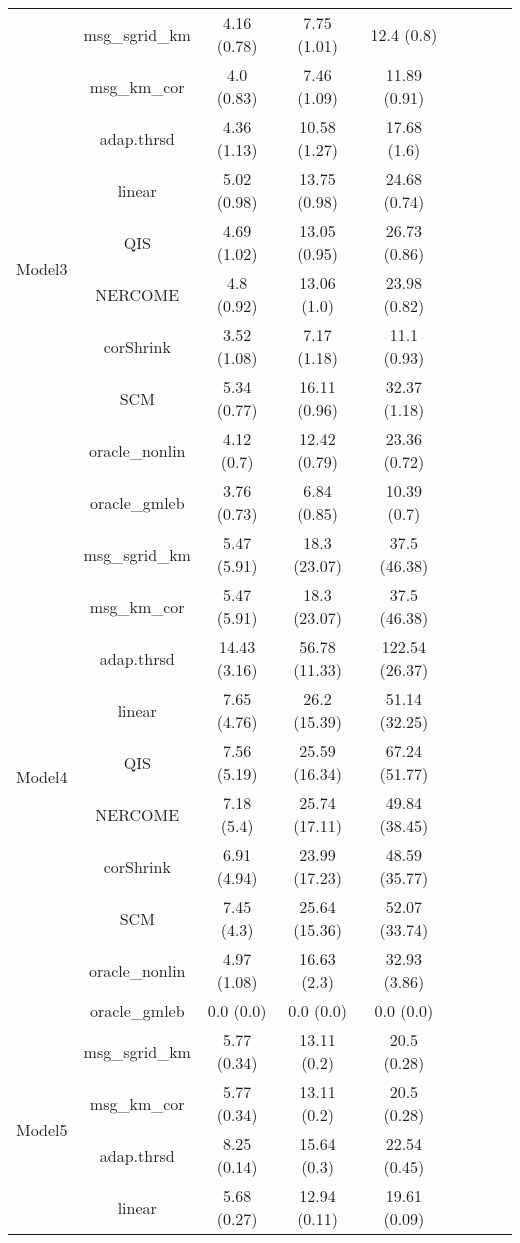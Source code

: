 \documentclass[useAMS,referee,usenatbib]{biom}
\begin{document}
\begin{table}[H]
{\begin{tabular}{ccccccccc}
\multirow{10}{*}{Model3}    
 & msg\_sgrid\_km & 4.16 (0.78) & 7.75 (1.01)  & 12.4 (0.8)   \\
 & msg\_km\_cor   & 4.0 (0.83)  & 7.46 (1.09)  & 11.89 (0.91) \\
 & adap.thrsd     & 4.36 (1.13) & 10.58 (1.27) & 17.68 (1.6)  \\
 & linear         & 5.02 (0.98) & 13.75 (0.98) & 24.68 (0.74) \\
 & QIS            & 4.69 (1.02) & 13.05 (0.95) & 26.73 (0.86) \\
 & NERCOME        & 4.8 (0.92)  & 13.06 (1.0)  & 23.98 (0.82) \\
 & corShrink      & 3.52 (1.08) & 7.17 (1.18)  & 11.1 (0.93)  \\
 & SCM            & 5.34 (0.77) & 16.11 (0.96) & 32.37 (1.18) \\
 & oracle\_nonlin & 4.12 (0.7)  & 12.42 (0.79) & 23.36 (0.72) \\
 & oracle\_gmleb  & 3.76 (0.73) & 6.84 (0.85)  & 10.39 (0.7)  \\  \midrule
\multirow{10}{*}{Model4}    
 & msg\_sgrid\_km & 5.47 (5.91)  & 18.3 (23.07)  & 37.5 (46.38)   \\
 & msg\_km\_cor   & 5.47 (5.91)  & 18.3 (23.07)  & 37.5 (46.38)   \\
 & adap.thrsd     & 14.43 (3.16) & 56.78 (11.33) & 122.54 (26.37) \\
 & linear         & 7.65 (4.76)  & 26.2 (15.39)  & 51.14 (32.25)  \\
 & QIS            & 7.56 (5.19)  & 25.59 (16.34) & 67.24 (51.77)  \\
 & NERCOME        & 7.18 (5.4)   & 25.74 (17.11) & 49.84 (38.45)  \\
 & corShrink      & 6.91 (4.94)  & 23.99 (17.23) & 48.59 (35.77)  \\
 & SCM            & 7.45 (4.3)   & 25.64 (15.36) & 52.07 (33.74)  \\
 & oracle\_nonlin & 4.97 (1.08)  & 16.63 (2.3)   & 32.93 (3.86)   \\
 & oracle\_gmleb  & 0.0 (0.0)    & 0.0 (0.0)     & 0.0 (0.0)  \\ \midrule
\multirow{10}{*}{Model5}  
 & msg\_sgrid\_km & 5.77 (0.34) & 13.11 (0.2)  & 20.5 (0.28)  \\
 & msg\_km\_cor   & 5.77 (0.34) & 13.11 (0.2)  & 20.5 (0.28)  \\
 & adap.thrsd     & 8.25 (0.14) & 15.64 (0.3)  & 22.54 (0.45) \\
 & linear         & 5.68 (0.27) & 12.94 (0.11) & 19.61 (0.09) \\

\end{tabular}}
\end{table}
\end{document}
